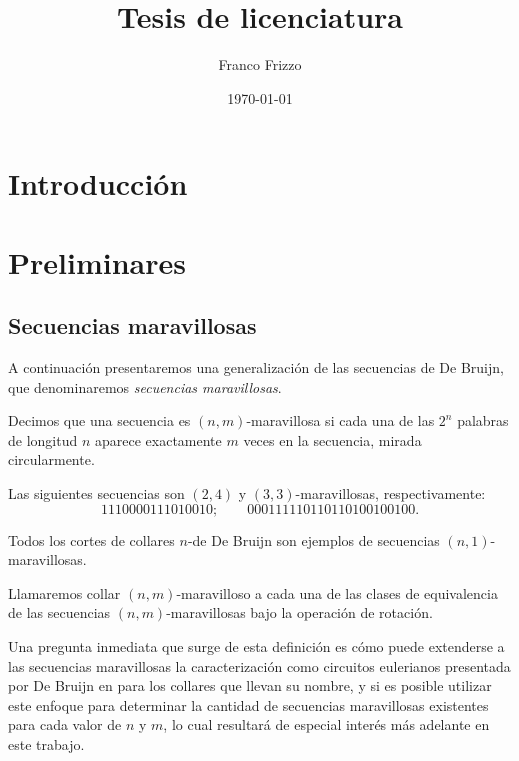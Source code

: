 \documentclass[11pt]{article}
\newcommand\myauthor{Franco Frizzo}
\newcommand\mytitle{Tesis de licenciatura}
\newcommand\mydate{\today}
\begin{document}
\title{\mytitle}
\author{\myauthor}
\date{\mydate}

\maketitle
\tableofcontents

\section{Introducción}

\section{Preliminares}




\subsection{Secuencias maravillosas}

A continuación presentaremos una generalización de las secuencias de De Bruijn,
que denominaremos \emph{secuencias maravillosas}.

Decimos que una secuencia es $(n,m)$-maravillosa si cada una de las $2^n$
palabras de longitud $n$ aparece exactamente $m$ veces en la secuencia, mirada
circularmente.

\begin{examples}
	Las siguientes secuencias son $(2,4)$ y $(3,3)$-maravillosas, respectivamente:
	\[ 1110000111010010; \qquad 000111110110110100100100.
	\]

	Todos los cortes de collares $n$-de De Bruijn son ejemplos de secuencias
	$(n,1)$-maravillosas.
\end{examples}

Llamaremos collar $(n,m)$-maravilloso a cada una de las clases de equivalencia
de las secuencias $(n,m)$-maravillosas bajo la operación de rotación.

Una pregunta inmediata que surge de esta definición es cómo puede extenderse a
las secuencias maravillosas la caracterización como circuitos eulerianos
presentada por De Bruijn en \cite{db} para los collares que llevan su nombre, y
si es posible utilizar este enfoque para determinar la cantidad de secuencias
maravillosas existentes para cada valor de $n$ y $m$, lo cual resultará de
especial interés más adelante en este trabajo.
\end{document}
